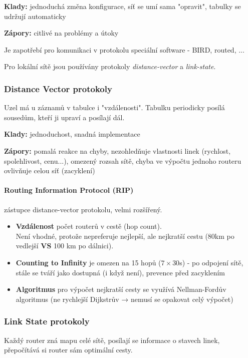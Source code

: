 \documentclass[10pt,a4paper]{article}
\begin{document}
\textbf{Klady:} jednoduchá změna konfigurace, síť se umí sama "opravit", tabulky se udržují automaticky

\textbf{Zápory:} citlivé na problémy a útoky

Je zapotřebí pro komunikaci v protokolu speciální software - BIRD, routed, ...

Pro lokální sítě jsou používány protokoly \textit{distance-vector} a \textit{link-state}.

\subsubsection{Distance Vector protokoly}

Uzel má u záznamů v tabulce i "vzdálenosti". Tabulku periodicky posílá sousedům, kteří ji upraví a posílají dál.

\textbf{Klady:} jednoduchost, snadná implementace

\textbf{Zápory:} pomalá reakce na chyby, 
nezohledňuje vlastnosti linek (rychlost, spolehlivost, cenu...),
 omezený rozsah sítě, 
 chyba ve výpočtu jednoho routeru ovlivňuje celou síť (zacyklení)


\paragraph{Routing Information Protocol (RIP)} zástupce distance-vector protokolu, velmi rozšířený.

\begin{itemize}
    \item \textbf{Vzdálenost} počet routerů v cestě (hop count).\\ Není vhodné, protože nepreferuje nejlepší, ale nejkratší cestu (80km po vedlejší \textbf{VS} 100 km po dálnici).
    \item \textbf{Counting to Infinity} je omezen na 15 hopů ($7 \times 30$s) - po odpojení sítě, stále se tváří jako dostupná (i když není), prevence před zacyklením
    \item \textbf{Algoritmus} pro výpočet nejkratší cesty se využívá Nellman-Fordův algoritmus (ne rychlejší Dijkstrův → nemusí se opakovat celý výpočet)
\end{itemize}

\subsubsection{Link State protokoly}

Každý router zná mapu celé sítě, posílají se informace o stavech linek, přepočítává si router sám optimální cesty.
\end{document}
